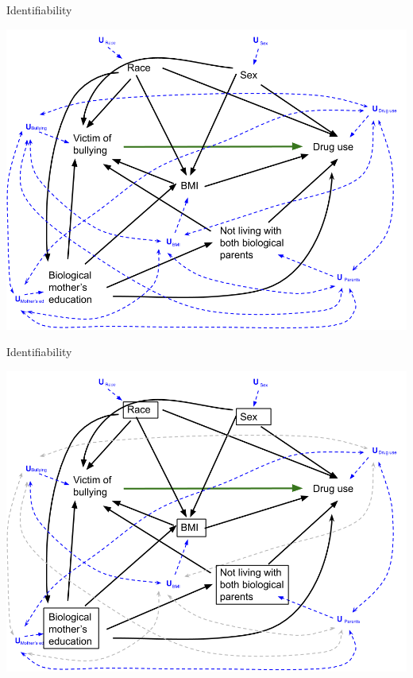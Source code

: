 \documentclass[ignorenonframetext,]{beamer}
\begin{document}
\begin{frame}{Identifiability}

\includegraphics[width=1\linewidth]{DAG Causal Final Project_reduced covariates with Us_reality}

\end{frame}

\begin{frame}{Identifiability}

\includegraphics[width=1\linewidth]{DAG Causal Final Project_reduced covariates with Us_convenience}

\end{frame}
\end{document}
